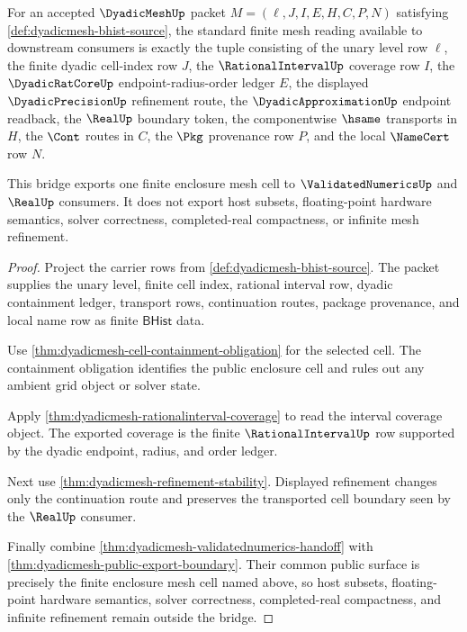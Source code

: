 \begin{theorem}
\label{thm:dyadicmesh-standard-finite-mesh-bridge-boundary}
For an accepted $\DyadicMeshUp$ packet
$M=(\ell,J,I,E,H,C,P,N)$ satisfying
\autoref{def:dyadicmesh-bhist-source}, the standard finite mesh reading
available to downstream consumers is exactly the tuple consisting of the unary
level row $\ell$, the finite dyadic cell-index row $J$, the
$\RationalIntervalUp$ coverage row $I$, the $\DyadicRatCoreUp$
endpoint-radius-order ledger $E$, the displayed $\DyadicPrecisionUp$
refinement route, the $\DyadicApproximationUp$ endpoint readback, the
$\RealUp$ boundary token, the componentwise $\hsame$ transports in $H$, the
$\Cont$ routes in $C$, the $\Pkg$ provenance row $P$, and the local
$\NameCert$ row $N$.

This bridge exports one finite enclosure mesh cell to
$\ValidatedNumericsUp$ and $\RealUp$ consumers. It does not export host
subsets, floating-point hardware semantics, solver correctness,
completed-real compactness, or infinite mesh refinement.
\end{theorem}
\begin{proof}
Project the carrier rows from \autoref{def:dyadicmesh-bhist-source}. The
packet supplies the unary level, finite cell index, rational interval row,
dyadic containment ledger, transport rows, continuation routes, package
provenance, and local name row as finite $\mathsf{BHist}$ data.

Use \autoref{thm:dyadicmesh-cell-containment-obligation} for the selected
cell. The containment obligation identifies the public enclosure cell and
rules out any ambient grid object or solver state.

Apply \autoref{thm:dyadicmesh-rationalinterval-coverage} to read the interval
coverage object. The exported coverage is the finite $\RationalIntervalUp$
row supported by the dyadic endpoint, radius, and order ledger.

Next use \autoref{thm:dyadicmesh-refinement-stability}. Displayed refinement
changes only the continuation route and preserves the transported cell
boundary seen by the $\RealUp$ consumer.

Finally combine \autoref{thm:dyadicmesh-validatednumerics-handoff} with
\autoref{thm:dyadicmesh-public-export-boundary}. Their common public surface
is precisely the finite enclosure mesh cell named above, so host subsets,
floating-point hardware semantics, solver correctness, completed-real
compactness, and infinite refinement remain outside the bridge.
\end{proof}

